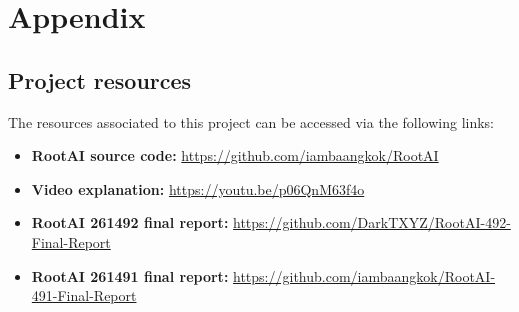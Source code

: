 \chapter{Appendix}


\section{Project resources}

The resources associated to this project can be accessed via the following links:
\begin{itemize}
    \item \textbf{RootAI source code:} \url{https://github.com/iambaangkok/RootAI}
    \item \textbf{Video explanation:} \url{https://youtu.be/p06QnM63f4o}
    \item \textbf{RootAI 261492 final report:} \url{https://github.com/DarkTXYZ/RootAI-492-Final-Report}
    \item \textbf{RootAI 261491 final report:} \url{https://github.com/iambaangkok/RootAI-491-Final-Report}
\end{itemize}










